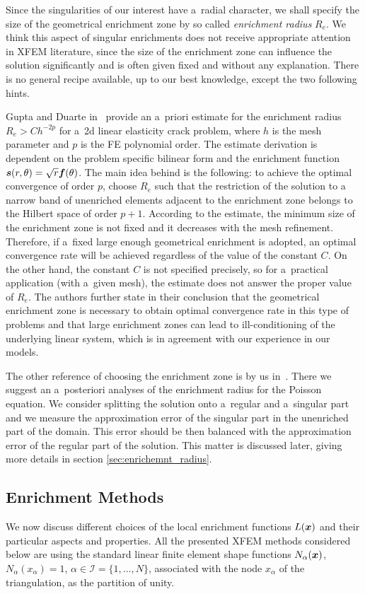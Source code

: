 Since the singularities of our interest have a~radial character, we shall specify the size of the geometrical enrichment zone by so called \emph{enrichment radius} $R_e$.
We think this aspect of singular enrichments does not receive appropriate attention in XFEM literature, since the size of the enrichment zone
can influence the solution significantly and is often given fixed and without any explanation.
There is no general recipe available, up to our best knowledge, except the two following hints.

Gupta and Duarte in~\cite{gupta_enr_zone_2016} provide an a~priori estimate for the enrichment radius $R_e>Ch^{-2p}$ for a~2d linear elasticity crack problem,
where $h$ is the mesh parameter and $p$ is the FE polynomial order.
The estimate derivation is dependent on the problem specific bilinear form and the enrichment function $\mathbf{\boldsymbol{s}}(r,\theta) = \sqrt{r} \mathbf{\boldsymbol{f}}(\theta)$.
The main idea behind is the following: to achieve the optimal convergence of order $p$, choose $R_e$ such that the restriction of the solution to
a narrow band of unenriched elements adjacent to the enrichment zone belongs to the Hilbert space of order $p+1$.
According to the estimate, the minimum size of the enrichment zone is not fixed and it decreases with the mesh refinement.
Therefore, if a~fixed large enough geometrical enrichment is adopted, an optimal convergence rate will be achieved regardless of the value of the constant $C$.
On the other hand, the constant $C$ is not specified precisely, so for a~practical application (with a~given mesh), the estimate does not answer the proper value of $R_e$.
The authors further state in their conclusion that the geometrical enrichment zone is necessary to obtain optimal convergence rate in this type of problems
and that large enrichment zones can lead to ill-conditioning of the underlying linear system, which is in agreement with our experience in our models.

The other reference of choosing the enrichment zone is by us in~\cite{exner_2016}.
There we suggest an a~posteriori analyses of the enrichment radius for the Poisson equation.
We consider splitting the solution onto a~regular and a~singular part and we measure the approximation error of the singular part
in the unenriched part of the domain. This error should be then balanced with the approximation error of the regular part of the solution.
This matter is discussed later, giving more details in section \ref{sec:enrichemnt_radius}.

 
\subsection{Enrichment Methods} \label{sec:enrichment_methods}
We now discuss different choices of the local enrichment functions $L(\mathbf{\boldsymbol{x}})$ and their particular aspects and properties.
All the presented XFEM methods considered below are using the standard linear finite element shape 
functions $N_\alpha(\mathbf{\boldsymbol{x}})$, $N_\alpha(x_\alpha)=1$, $\alpha\in\mathcal{I}=\{1,\ldots,N\}$, associated with the node $x_\alpha$ of the triangulation,
as the partition of unity.

